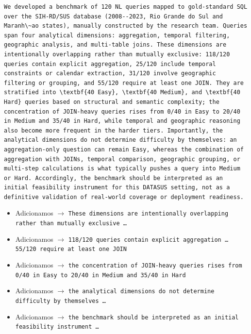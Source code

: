\documentclass[11pt,a4paper]{article}
\begin{document}
\begin{finalblock}
\begin{lstlisting}[style=texsnippet]
We developed a benchmark of 120 NL queries mapped to gold-standard SQL over the SIH-RD/SUS database (2008--2023, Rio Grande do Sul and Maranh\~ao states), manually constructed by the research team. Queries span four analytical dimensions: aggregation, temporal filtering, geographic analysis, and multi-table joins. These dimensions are intentionally overlapping rather than mutually exclusive: 118/120 queries contain explicit aggregation, 25/120 include temporal constraints or calendar extraction, 31/120 involve geographic filtering or grouping, and 55/120 require at least one JOIN. They are stratified into \textbf{40 Easy}, \textbf{40 Medium}, and \textbf{40 Hard} queries based on structural and semantic complexity; the concentration of JOIN-heavy queries rises from 0/40 in Easy to 20/40 in Medium and 35/40 in Hard, while temporal and geographic reasoning also become more frequent in the harder tiers. Importantly, the analytical dimensions do not determine difficulty by themselves: an aggregation-only question can remain Easy, whereas the combination of aggregation with JOINs, temporal comparison, geographic grouping, or multi-step calculations is what typically pushes a query into Medium or Hard. Accordingly, the benchmark should be interpreted as an initial feasibility instrument for this DATASUS setting, not as a definitive validation of real-world coverage or deployment readiness.
\end{lstlisting}
\end{finalblock}

\begin{trackblock}
\begin{itemize}
  \item Adicionamos $\to$ \texttt{These dimensions are intentionally overlapping rather than mutually exclusive \ldots}
  \item Adicionamos $\to$ \texttt{118/120 queries contain explicit aggregation \ldots 55/120 require at least one JOIN}
  \item Adicionamos $\to$ \texttt{the concentration of JOIN-heavy queries rises from 0/40 in Easy to 20/40 in Medium and 35/40 in Hard}
  \item Adicionamos $\to$ \texttt{the analytical dimensions do not determine difficulty by themselves \ldots}
  \item Adicionamos $\to$ \texttt{the benchmark should be interpreted as an initial feasibility instrument \ldots}
\end{itemize}
\end{trackblock}
\end{document}
